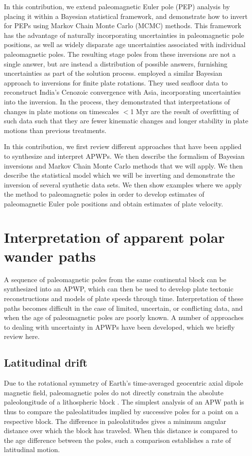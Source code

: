 \documentclass[11pt,letterpaper]{article}
\begin{document}
In this contribution, we extend paleomagnetic Euler pole (PEP) analysis by placing it within a Bayesian statistical framework, and demonstrate how to invert for PEPs using Markov Chain Monte Carlo (MCMC) methods. This framework has the advantage of naturally incorporating uncertainties in paleomagnetic pole positions, as well as widely disparate age uncertainties associated with individual paleomagnetic poles. The resulting stage poles from these inversions are not a single answer, but are instead a distribution of possible answers, furnishing uncertainties as part of the solution process. \citet{Iaffaldano2012a} employed a similar Bayesian approach to inversions for finite plate rotations. They used seafloor data to reconstruct India's Cenozoic convergence with Asia, incorporating uncertainties into the inversion. In the process, they demonstrated that interpretations of changes in plate motions on timescales $<$1 Myr are the result of overfitting of such data such that they are fewer kinematic changes and longer stability in plate motions than previous treatments.

In this contribution, we first review different approaches that have been applied to synthesize and interpret APWPs. We then describe the formalism of Bayesian inversions and Markov Chain Monte Carlo methods that we will apply. We then describe the statistical model which we will be inverting and demonstrate the inversion of several synthetic data sets. We then show examples where we apply the method to paleomagnetic poles in order to develop estimates of paleomagnetic Euler pole positions and obtain estimates of plate velocity.

\section*{Interpretation of apparent polar wander paths}

A sequence of paleomagnetic poles from the same continental block can be synthesized into an APWP, which can then be used to develop plate tectonic reconstructions and models of plate speeds through time. Interpretation of these paths becomes difficult in the case of limited, uncertain, or conflicting data, and when the age of paleomagnetic poles are poorly known. A number of approaches to dealing with uncertainty in APWPs have been developed, which we briefly review here.

\subsection*{Latitudinal drift}
Due to the rotational symmetry of Earth's time-averaged geocentric axial dipole magnetic field, paleomagnetic poles do not directly constrain the absolute paleolongitude of a lithospheric block \citep{Butler1992a}. The simplest analysis of an APW path is thus to compare the paleolatitudes implied by successive poles for a point on a respective block. The difference in paleolatitudes gives a minimum angular distance over which the block has traveled.  When this distance is compared to the age difference between the poles, such a comparison establishes a rate of latitudinal motion.
\end{document}
